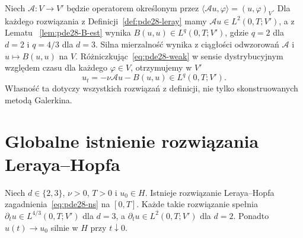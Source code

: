 \begin{uwaga}
Niech $\mathcal A:V\to V'$ będzie operatorem
określonym przez
$\langle\mathcal Au,\varphi\rangle=(u,\varphi)_V$.
Dla każdego rozwiązania z Definicji~\ref{def:pde28-leray}
mamy $\mathcal Au\in L^2(0,T;V')$, a z Lematu
~\ref{lem:pde28-B-est} wynika $B(u,u)\in L^q(0,T;V')$,
gdzie $q=2$ dla $d=2$ i $q=4/3$ dla $d=3$.
Silna mierzalność wynika z ciągłości odwzorowań
$\mathcal A$ i $u\mapsto B(u,u)$ na $V$.
Różniczkując~\eqref{eq:pde28-weak} w sensie
dystrybucyjnym względem czasu dla każdego $\varphi\in V$,
otrzymujemy w $V'$
\[
 u_t=-\nu\mathcal Au-B(u,u)\in L^q(0,T;V').
\]
Własność ta dotyczy wszystkich rozwiązań z definicji,
nie tylko skonstruowanych metodą Galerkina.
\end{uwaga}

\section{Globalne istnienie rozwiązania Leraya--Hopfa}
\begin{twierdzenie}
\label{thm:pde28-existence}
Niech $d\in\{2,3\}$, $\nu>0$, $T>0$ i $u_0\in H$.
Istnieje rozwiązanie Leraya--Hopfa zagadnienia~\eqref{eq:pde28-ns}
na $[0,T]$. Każde takie rozwiązanie spełnia
$\partial_tu\in L^{4/3}(0,T;V')$ dla $d=3$,
a $\partial_tu\in L^2(0,T;V')$ dla $d=2$.
Ponadto $u(t)\to u_0$ silnie w $H$ przy $t\downarrow0$.
\end{twierdzenie}

